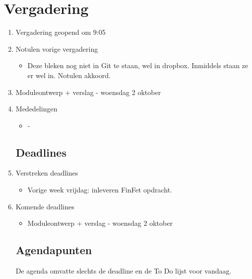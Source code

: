 \documentclass{article}
\begin{document}
\section*{Vergadering}
\begin{enumerate}
	
	\subsection*{Vooraf}
	\item Vergadering geopend om 9:05  %
	\item Notulen vorige vergadering
	\begin{itemize}
		\item Deze bleken nog niet in Git te staan, wel in dropbox. Inmiddels staan ze er wel in. Notulen akkoord.
	\end{itemize}
	\item Moduleontwerp + verslag - woensdag 2 oktober
	\item Mededelingen
	\begin{itemize}
		\item -
	\end{itemize}

	\subsection*{Deadlines}
	\item Verstreken deadlines
	\begin{itemize}
		\item Vorige week vrijdag: inleveren FinFet opdracht.
	\end{itemize}
	\item Komende deadlines
	\begin{itemize}
		\item Moduleontwerp + verslag - woensdag 2 oktober
	\end{itemize}

	\subsection*{Agendapunten}
	De agenda omvatte slechts de deadline en de To Do lijst voor vandaag. 


\end{enumerate}
\end{document}
